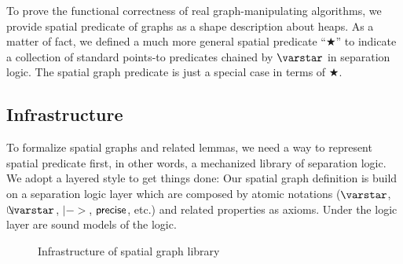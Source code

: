 To prove the functional correctness of real graph-manipulating
algorithms, we provide spatial predicate of graphs as a shape
description about heaps. As a matter of fact, we defined a much more
general spatial predicate ``$\bigstar$'' to indicate a collection of
standard points-to predicates chained by $\scon$ in separation
logic. The spatial graph predicate is just a special case in terms of
$\bigstar$.

\subsection{Infrastructure}
To formalize spatial graphs and related lemmas, we need a way to
represent spatial predicate first, in other words, a mechanized
library of separation logic. We adopt a layered style to get things
done: Our spatial graph definition is build on a separation logic
layer which are composed by atomic notations ($\scon$, $\ocon$, $|->$,
$\mathsf{precise}$, etc.) and related properties as axioms. Under the logic
layer are sound models of the logic.

\begin{figure}[htbp]
\centering
{}
\endpgfgraphicnamed
\vspace{1ex}
\caption{Infrastructure of spatial graph library}
\end{figure}



